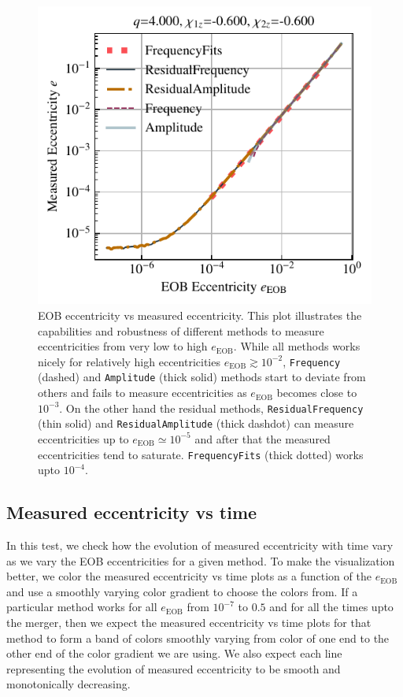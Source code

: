 \documentclass[aps,prd,amsmath,floats,floatfix, twocolumn,
superscriptaddress,nofootinbib,showpacs]{revtex4-1}
\begin{document}
\begin{figure}[thb]
\includegraphics[width=\columnwidth]{test_eob_vs_measured_ecc_example}
\caption{EOB eccentricity vs measured eccentricity. This plot illustrates the capabilities and robustness of different methods to measure eccentricities from very low to high $e_{\text{EOB}}$.
  While all methods works nicely for relatively high eccentricities $e_{\text{EOB}} \gtrsim 10^{-2}$, \texttt{Frequency} (dashed) and \texttt{Amplitude} (thick solid) methods start to deviate from others
  and fails to measure eccentricities as $e_{\text{EOB}}$ becomes close to $10^{-3}$. On the other hand the residual methods, \texttt{ResidualFrequency} (thin solid) and \texttt{ResidualAmplitude}
  (thick dashdot) can measure eccentricities up to $e_{\text{EOB}} \simeq 10^{-5}$ and after that the measured eccentricities tend to saturate. \texttt{FrequencyFits} (thick dotted) works upto $10^{-4}$.}
\label{fig:eob_vs_measured_ecc}
\end{figure}

\subsection{Measured eccentricity vs time}
\label{sec:measured-eccentricity-vs-time}
In this test, we check how the evolution of measured eccentricity with time vary as we vary the EOB eccentricities for a given method. To make the visualization better,
we color the measured eccentricity vs time plots as a function of the $e_{\text{EOB}}$ and use a smoothly varying color gradient to choose the colors from. If a particular method
works for all $e_{\text{EOB}}$ from $10^{-7}$ to $0.5$ and for all the times upto the merger, then we expect the measured eccentricity vs time plots for that method to form a band of colors
smoothly varying from color of one end to the other end of the color gradient we are using. We also expect each line representing the evolution of measured eccentricity to be smooth and monotonically
decreasing.
\end{document}
